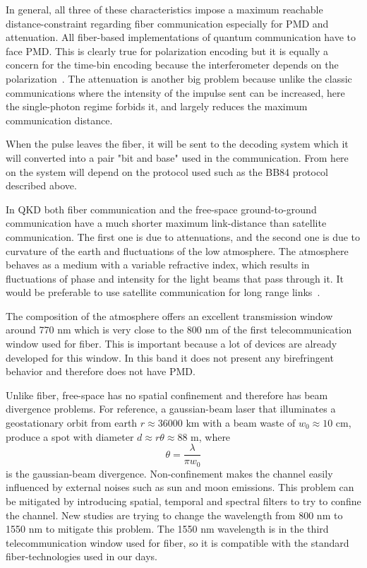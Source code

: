 In general, all three of these characteristics impose a maximum reachable distance-constraint regarding fiber communication especially for PMD and attenuation. All fiber-based implementations of quantum communication have to face PMD. This is clearly true for polarization encoding but it is equally a concern for the time-bin encoding because the interferometer depends on the polarization~\cite{a25}. The attenuation is another big problem because unlike the classic communications where the intensity of the impulse sent can be increased, here the single-photon regime forbids it, and largely reduces the maximum communication distance.

When the pulse leaves the fiber, it will be sent to the decoding system which it will converted into a pair "bit and base" used in the communication. From here on the system will depend on the protocol used such as the BB84 protocol described above.


In QKD both fiber communication and the free-space ground-to-ground communication have a much shorter maximum link-distance than satellite communication. The first one is due to attenuations, and the second one is due to curvature of the earth and fluctuations of the low atmosphere. The atmosphere behaves as a medium with a variable refractive index, which results in fluctuations of phase and intensity for the light beams that pass through it. It would be preferable to use satellite communication for long range links~\cite{a14}.

The composition of the atmosphere offers an excellent transmission window around 770 nm which is very close to the 800 nm of the first telecommunication window used for fiber. This is important because a lot of devices are already developed for this window. In this band it does not present any birefringent behavior and therefore does not have PMD.

Unlike fiber, free-space has no spatial confinement and therefore has beam divergence problems. For reference, a gaussian-beam laser that illuminates a geostationary orbit from earth $r \approx 36000$ km with a beam waste of $w_0 \approx 10$ cm, produce a spot with diameter $d \approx r \theta \approx 88$ m, where
\begin{equation}
  \theta = \frac{\lambda}{\pi w_0}
\end{equation}
is the gaussian-beam divergence. Non-confinement makes the channel easily influenced by external noises such as sun and moon emissions. This problem can be mitigated by introducing spatial, temporal and spectral filters to try to confine the channel. New studies are trying to change the wavelength from 800 nm to 1550 nm to mitigate this problem. The 1550 nm wavelength is in the third telecommunication window used for fiber, so it is compatible with the standard fiber-technologies used in our days.

